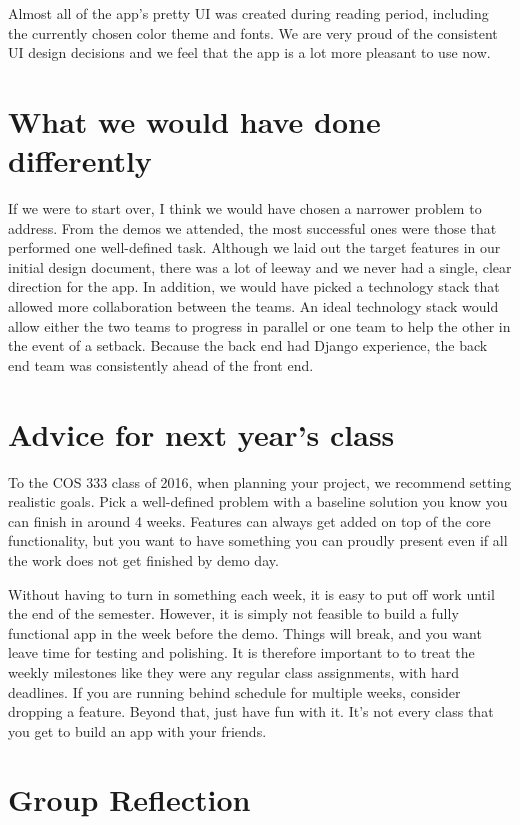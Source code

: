 \documentclass[12pt]{article}
\begin{document}
Almost all of the app's pretty UI was created during reading period, including the currently chosen color theme and fonts. We are very proud of the consistent UI design decisions and we feel that the app is a lot more pleasant to use now.

\section{What we would have done differently}

If we were to start over, I think we would have chosen a narrower problem to address. 
From the demos we attended, the most successful ones were those that performed one well-defined task. 
Although we laid out the target features in our initial design document, there was a lot of leeway and we never had a single, clear direction for the app.
In addition, we would have picked a technology stack that allowed more collaboration between the teams.
An ideal technology stack would allow either the two teams to progress in parallel or one team to help the other in the event of a setback. 
Because the back end had Django experience, the back end team was consistently ahead of the front end.

\section{Advice for next year's class}

To the COS 333 class of 2016, when planning your project, we recommend setting realistic goals. 
Pick a well-defined problem with a baseline solution you know you can finish in around 4 weeks.
Features can always get added on top of the core functionality, but you want to have something you
can proudly present even if all the work does not get finished by demo day.

Without having to turn in something each week, it is easy to put off work until the end of the semester.
However, it is simply not feasible to build a fully functional app in the week before the demo. 
Things will break, and you want leave time for testing and polishing.
It is therefore important to to treat the weekly milestones like they were any regular class assignments, with hard deadlines. 
If you are running behind schedule for multiple weeks, consider dropping a feature.
Beyond that, just have fun with it. It's not every class that you get to build an app with your friends.

\section{Group Reflection}
\end{document}
